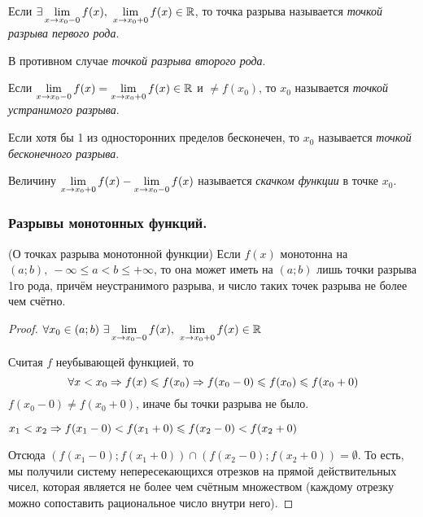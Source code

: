 \begin{definition}
	Если $\exists \liml_{x \to x_0-0} f(x),\ \liml_{x \to x_0+0} f(x) \in \R$, то точка разрыва называется \textit{точкой разрыва первого рода}.
	
	В противном случае \textit{точкой разрыва второго рода}.
\end{definition}

\begin{definition}
	Если $\lim\limits_{x \to x_0-0} f(x) = \lim\limits_{x \to x_0+0} f(x) \in \mathbb{R}$ и $\neq f(x_0)$, то $x_0$ называется \textit{точкой устранимого разрыва}.
\end{definition}

\begin{definition}
	Если хотя бы 1 из односторонних пределов бесконечен, то $x_0$ называется \textit{точкой бесконечного разрыва}.
\end{definition}

\begin{definition}
	Величину $\lim\limits_{x \to x_0+0} f(x) - \lim\limits_{x \to x_0-0} f(x)$ называется \textit{скачком функции} в точке $x_0$.
\end{definition}

\subsubsection{Разрывы монотонных функций.}

\begin{theorem} (О точках разрыва монотонной функции)
	Если $f(x)$ монотонна на $(a; b),\ -\infty \le a < b \le +\infty$, то она может иметь на $(a; b)$ лишь точки разрыва 1го рода, причём неустранимого разрыва, и число таких точек разрыва не более чем счётно.
\end{theorem}

\begin{proof}
	$\forall x_0 \in (a; b)\ \exists \liml_{x \to x_0-0} f(x),\ \liml_{x \to x_0+0} f(x) \in \R$
	
	Считая $f$ неубывающей функцией, то 
	$$
		\forall x < x_0 \Rightarrow f(x) \leqslant f(x_0) \Rightarrow f(x_0 - 0) \leqslant f(x_0) \leqslant f(x_0 + 0)
	$$
	$f(x_0 - 0) \neq f(x_0 + 0)$, иначе бы точки разрыва не было.
	
	$x_1 < x_2 \Rightarrow f(x_1 - 0) < f(x_1 + 0) \leqslant f(x_2 - 0) < f(x_2 + 0)$
	
	Отсюда $(f(x_1 - 0); f(x_1 + 0)) \cap (f(x_2 - 0); f(x_2 + 0)) = \emptyset$. То есть, мы получили систему непересекающихся отрезков на прямой действительных чисел, которая является не более чем счётным множеством (каждому отрезку можно сопоставить рациональное число внутри него).
\end{proof}

